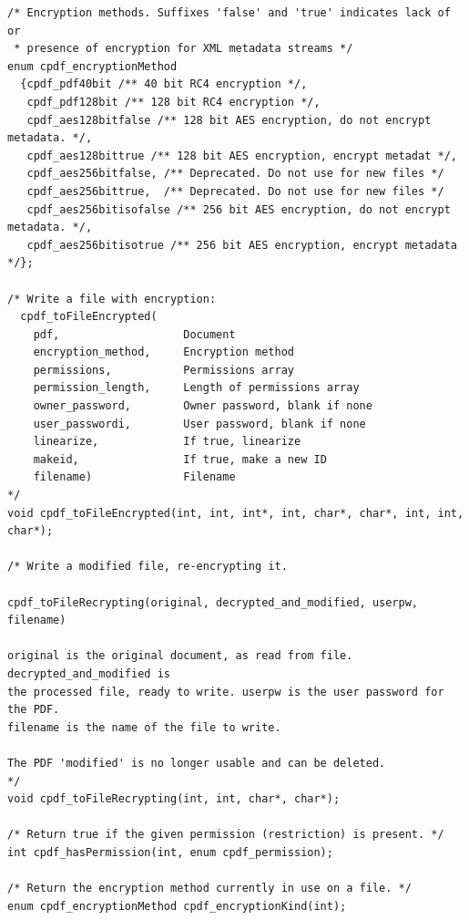 \documentclass[a4paper]{memoir}
\begin{document}
\begin{small}
\begin{lstlisting}
/* Encryption methods. Suffixes 'false' and 'true' indicates lack of or
 * presence of encryption for XML metadata streams */
enum cpdf_encryptionMethod
  {cpdf_pdf40bit /** 40 bit RC4 encryption */, 
   cpdf_pdf128bit /** 128 bit RC4 encryption */,
   cpdf_aes128bitfalse /** 128 bit AES encryption, do not encrypt metadata. */,
   cpdf_aes128bittrue /** 128 bit AES encryption, encrypt metadat */,
   cpdf_aes256bitfalse, /** Deprecated. Do not use for new files */
   cpdf_aes256bittrue,  /** Deprecated. Do not use for new files */
   cpdf_aes256bitisofalse /** 256 bit AES encryption, do not encrypt metadata. */,
   cpdf_aes256bitisotrue /** 256 bit AES encryption, encrypt metadata */};

/* Write a file with encryption:
  cpdf_toFileEncrypted(
    pdf,                   Document
    encryption_method,     Encryption method
    permissions,           Permissions array
    permission_length,     Length of permissions array
    owner_password,        Owner password, blank if none
    user_passwordi,        User password, blank if none
    linearize,             If true, linearize
    makeid,                If true, make a new ID
    filename)              Filename
*/
void cpdf_toFileEncrypted(int, int, int*, int, char*, char*, int, int, char*);

/* Write a modified file, re-encrypting it.

cpdf_toFileRecrypting(original, decrypted_and_modified, userpw, filename)

original is the original document, as read from file. decrypted_and_modified is
the processed file, ready to write. userpw is the user password for the PDF.
filename is the name of the file to write.

The PDF 'modified' is no longer usable and can be deleted.
*/
void cpdf_toFileRecrypting(int, int, char*, char*);

/* Return true if the given permission (restriction) is present. */
int cpdf_hasPermission(int, enum cpdf_permission);

/* Return the encryption method currently in use on a file. */
enum cpdf_encryptionMethod cpdf_encryptionKind(int);
\end{lstlisting}
\end{small}
\end{document}
